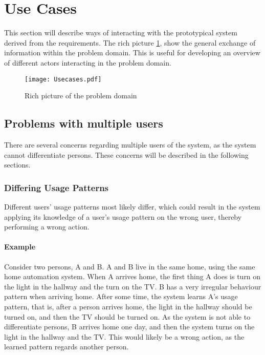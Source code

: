 \section{Use Cases}\label{sub:usecases}

This section will describe ways of interacting with the prototypical system derived from the requirements. The rich picture \cref{fig:richpicture}, show the general exchange of information within the problem domain. This is useful for developing an overview of different actors interacting in the problem domain.

\begin{figure}
  \centering
  \begin{adjustbox}{max width=\textwidth}
    \texttt{[image: Usecases.pdf]}
  \end{adjustbox}
  \caption[Rich picture]{Rich picture of the problem domain}
  \label{fig:richpicture}
\end{figure}

\subsection{Problems with multiple users}
There are several concerns regarding multiple users of the system, as the system cannot differentiate persons. These concerns will be described in the following sections.

\subsubsection{Differing Usage Patterns}
Different users' usage patterns most likely differ, which could result in the system applying its knowledge of a user's usage pattern on the wrong user, thereby performing a wrong action.
\paragraph{Example}
Consider two persons, A and B. A and B live in the same home, using the same home automation system. When A arrives home, the first thing A does is turn on the light in the hallway and the turn on the TV. B has a very irregular behaviour pattern when arriving home. After some time, the system learns A's usage pattern, that is, after a person arrives home, the light in the hallway should be turned on, and then the TV should be turned on. As the system is not able to differentiate persons, B arrives home one day, and then the system turns on the light in the hallway and the TV. This would likely be a wrong action, as the learned pattern regards another person.

